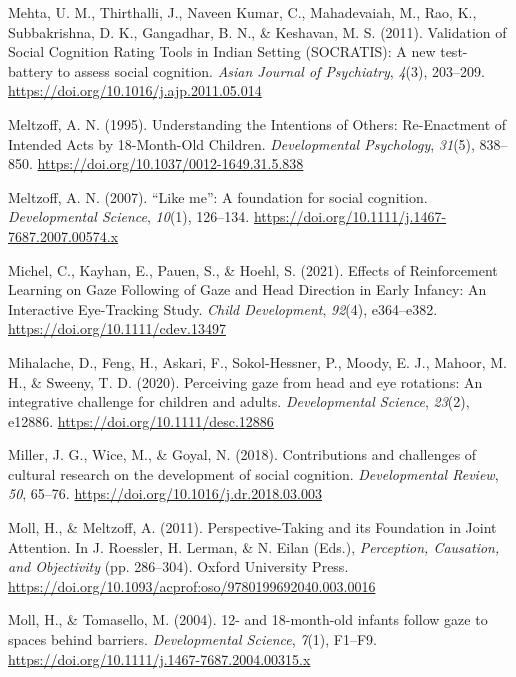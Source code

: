 \documentclass[
]{scrbook}
\newlength{\cslhangindent}
\newenvironment{CSLReferences}[2] %
 {\begin{list}{}{%
  \setlength{\itemindent}{0pt}
  \setlength{\leftmargin}{0pt}
  \setlength{\parsep}{0pt}
  \ifodd #1
   \setlength{\leftmargin}{\cslhangindent}
   \setlength{\itemindent}{-1\cslhangindent}
  \fi
  \setlength{\itemsep}{#2\baselineskip}}}
 {\end{list}}
\begin{document}
\begin{CSLReferences}{1}{0}
Mehta, U. M., Thirthalli, J., Naveen Kumar, C., Mahadevaiah, M., Rao, K., Subbakrishna, D. K., Gangadhar, B. N., \& Keshavan, M. S. (2011). Validation of {Social Cognition Rating Tools} in {Indian Setting} ({SOCRATIS}): {A} new test-battery to assess social cognition. \emph{Asian Journal of Psychiatry}, \emph{4}(3), 203--209. \url{https://doi.org/10.1016/j.ajp.2011.05.014}

Meltzoff, A. N. (1995). Understanding the {Intentions} of {Others}: {Re-Enactment} of {Intended Acts} by 18-{Month-Old Children}. \emph{Developmental Psychology}, \emph{31}(5), 838--850. \url{https://doi.org/10.1037/0012-1649.31.5.838}

Meltzoff, A. N. (2007). {``{Like} me''}: A foundation for social cognition. \emph{Developmental Science}, \emph{10}(1), 126--134. \url{https://doi.org/10.1111/j.1467-7687.2007.00574.x}

Michel, C., Kayhan, E., Pauen, S., \& Hoehl, S. (2021). Effects of {Reinforcement Learning} on {Gaze Following} of {Gaze} and {Head Direction} in {Early Infancy}: {An Interactive Eye-Tracking Study}. \emph{Child Development}, \emph{92}(4), e364--e382. \url{https://doi.org/10.1111/cdev.13497}

Mihalache, D., Feng, H., Askari, F., Sokol-Hessner, P., Moody, E. J., Mahoor, M. H., \& Sweeny, T. D. (2020). Perceiving gaze from head and eye rotations: {An} integrative challenge for children and adults. \emph{Developmental Science}, \emph{23}(2), e12886. \url{https://doi.org/10.1111/desc.12886}

Miller, J. G., Wice, M., \& Goyal, N. (2018). Contributions and challenges of cultural research on the development of social cognition. \emph{Developmental Review}, \emph{50}, 65--76. \url{https://doi.org/10.1016/j.dr.2018.03.003}

Moll, H., \& Meltzoff, A. (2011). Perspective-{Taking} and its {Foundation} in {Joint Attention}. In J. Roessler, H. Lerman, \& N. Eilan (Eds.), \emph{Perception, {Causation}, and {Objectivity}} (pp. 286--304). Oxford University Press. \url{https://doi.org/10.1093/acprof:oso/9780199692040.003.0016}

Moll, H., \& Tomasello, M. (2004). 12- and 18-month-old infants follow gaze to spaces behind barriers. \emph{Developmental Science}, \emph{7}(1), F1--F9. \url{https://doi.org/10.1111/j.1467-7687.2004.00315.x}


\end{CSLReferences}
\end{document}
